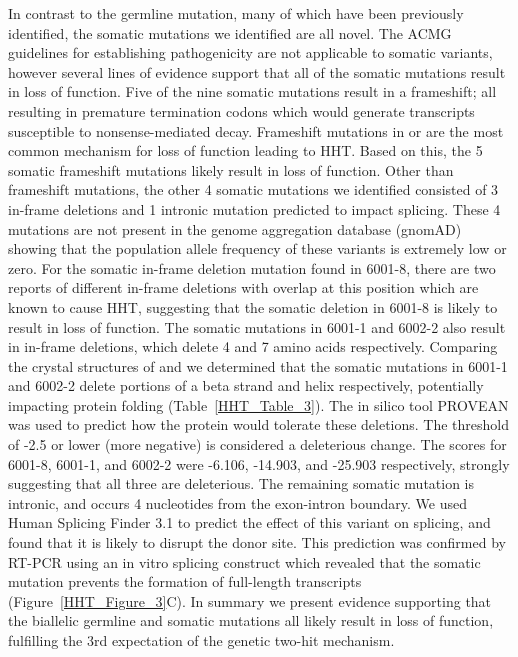 In contrast to the germline mutation, many of which have been previously identified, the somatic mutations we identified are all novel. The ACMG guidelines for establishing pathogenicity are not applicable to somatic variants, however several lines of evidence support that all of the somatic mutations result in loss of function. Five of the nine somatic mutations result in a frameshift; all resulting in premature termination codons which would generate transcripts susceptible to nonsense-mediated decay. Frameshift mutations in  or  are the most common mechanism for loss of function leading to HHT. Based on this, the 5 somatic frameshift mutations likely result in loss of function. Other than frameshift mutations, the other 4 somatic mutations we identified consisted of 3 in-frame deletions and 1 intronic mutation predicted to impact splicing. These 4 mutations are not present in the genome aggregation database (gnomAD) showing that the population allele frequency of these variants is extremely low or zero. For the somatic in-frame deletion mutation found in 6001-8, there are two reports of different in-frame deletions with overlap at this position which are known to cause HHT, suggesting that the somatic deletion in 6001-8 is likely to result in loss of function. The somatic mutations in 6001-1 and 6002-2 also result in in-frame deletions, which delete 4 and 7 amino acids respectively. Comparing the crystal structures of  and  we determined that the somatic mutations in 6001-1 and 6002-2 delete portions of a beta strand and helix respectively, potentially impacting protein folding (Table~\ref{HHT_Table_3}). The in silico tool PROVEAN was used to predict how the protein would tolerate these deletions.   The threshold of -2.5 or lower (more negative) is considered a deleterious change. The scores for 6001-8, 6001-1, and 6002-2 were -6.106, -14.903, and -25.903 respectively, strongly suggesting that all three are deleterious. The remaining somatic mutation is intronic, and occurs 4 nucleotides from the exon-intron boundary. We used Human Splicing Finder 3.1 to predict the effect of this variant on splicing, and found that it is likely to disrupt the donor site. This prediction was confirmed by RT-PCR using an in vitro splicing construct which revealed that the somatic mutation prevents the formation of full-length  transcripts (Figure~\ref{HHT_Figure_3}C). In summary we present evidence supporting that the biallelic germline and somatic mutations all likely result in loss of function, fulfilling the 3rd expectation of the genetic two-hit mechanism. 

